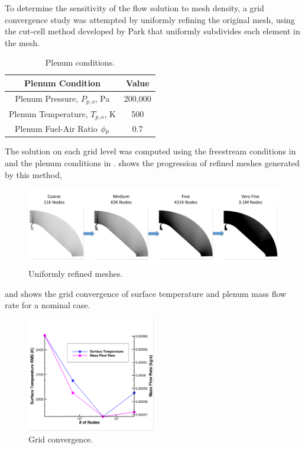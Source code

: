 To determine the sensitivity of the flow solution to mesh density, a grid
convergence study was attempted by uniformly refining the original mesh, using
the cut-cell method developed by Park\cite{park2008anisotropic} that uniformly
subdivides each element in the mesh.
\begin{table}[h]
  \centering
  \caption{Plenum conditions.}
  \begin{tabular}{c|c}
    Plenum Condition & Value \\
    \hline
    Plenum Pressure, $P_{p,o}$, Pa   & 200,000 \\
    Plenum Temperature, $T_{p,o}$, K &  500 \\
    Plenum Fuel-Air Ratio $\phi_p$      &  0.7
  \end{tabular}
  \label{tab:plenum-conditions}
\end{table}
The solution on each grid level was computed using the freestream conditions in
 and the plenum conditions in
.  shows the progression
of refined meshes generated by this method,
\begin{figure}[h]
  \centering
  \includegraphics[width=\textwidth]{figures/mesh-progression.png}
  \caption{Uniformly refined meshes.}
  \label{fig:mesh-refined}
\end{figure}
and  shows the grid convergence of surface
temperature and plenum mass flow rate for a nominal case.
\begin{figure}[!h]
  \centering
  \includegraphics[width=0.5\textwidth]{figures/t-m-conv.png}
  \caption{Grid convergence.}
  \label{fig:grid-convergence}
\end{figure}

